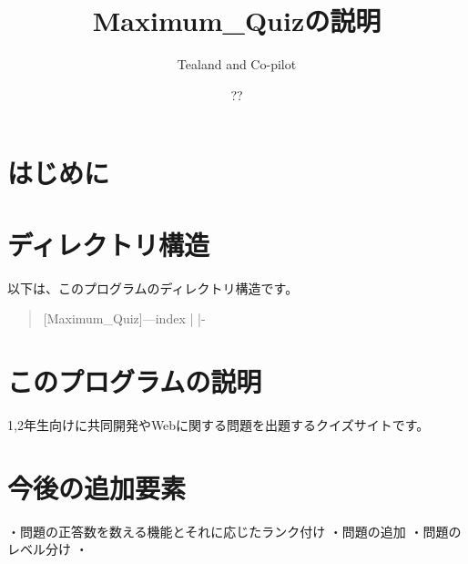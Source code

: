 \documentclass{article}
\title{Maximum_Quizの説明}
\author{Tealand and Co-pilot}
\date{??}
\begin{document}
\maketitle

\section{はじめに}


\section{ディレクトリ構造}

以下は、このプログラムのディレクトリ構造です。

\begin{verse}
[Maximum_Quiz]---{index}
      |            
      |-                 
                             

\end{verse}

\section{このプログラムの説明}

1,2年生向けに共同開発やWebに関する問題を出題するクイズサイトです。


\section{今後の追加要素}
・問題の正答数を数える機能とそれに応じたランク付け
・問題の追加
・問題のレベル分け
・
\end{document}
